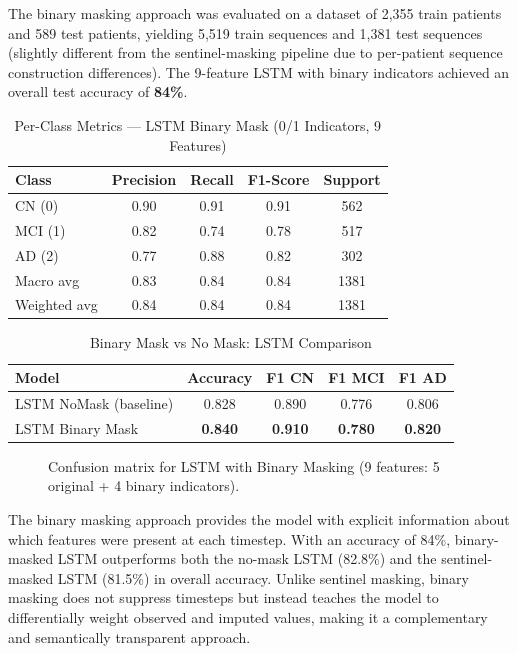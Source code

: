 \documentclass[12pt,singleside,a4paper]{article}
\begin{document}
The binary masking approach was evaluated on a dataset of 2,355 train patients and 589 test patients, yielding 5,519 train sequences and 1,381 test sequences (slightly different from the sentinel-masking pipeline due to per-patient sequence construction differences). The 9-feature LSTM with binary indicators achieved an overall test accuracy of \textbf{84\%}.

\begin{table}[h]
\centering
\caption{Per-Class Metrics --- LSTM Binary Mask (0/1 Indicators, 9 Features)}
\begin{tabular}{lcccc}
\toprule
\textbf{Class} & \textbf{Precision} & \textbf{Recall} & \textbf{F1-Score} & \textbf{Support} \\
\midrule
CN (0)  & 0.90 & 0.91 & 0.91 & 562 \\
MCI (1) & 0.82 & 0.74 & 0.78 & 517 \\
AD (2)  & 0.77 & 0.88 & 0.82 & 302 \\
\midrule
Macro avg    & 0.83 & 0.84 & 0.84 & 1381 \\
Weighted avg & 0.84 & 0.84 & 0.84 & 1381 \\
\bottomrule
\end{tabular}
\label{tab:per_class_binary_mask}
\end{table}

\begin{table}[h]
\centering
\caption{Binary Mask vs No Mask: LSTM Comparison}
\begin{tabular}{lcccc}
\toprule
\textbf{Model} & \textbf{Accuracy} & \textbf{F1 CN} & \textbf{F1 MCI} & \textbf{F1 AD} \\
\midrule
LSTM NoMask (baseline) & 0.828 & 0.890 & 0.776 & 0.806 \\
LSTM Binary Mask       & \textbf{0.840} & \textbf{0.910} & \textbf{0.780} & \textbf{0.820} \\
\bottomrule
\end{tabular}
\label{tab:binary_comparison}
\end{table}

\begin{figure}[h]
\centering
\caption{Confusion matrix for LSTM with Binary Masking (9 features: 5 original + 4 binary indicators).}
\label{fig:cm_binary}
\end{figure}

The binary masking approach provides the model with explicit information about which features were present at each timestep. With an accuracy of 84\%, binary-masked LSTM outperforms both the no-mask LSTM (82.8\%) and the sentinel-masked LSTM (81.5\%) in overall accuracy. Unlike sentinel masking, binary masking does not suppress timesteps but instead teaches the model to differentially weight observed and imputed values, making it a complementary and semantically transparent approach.
\end{document}
